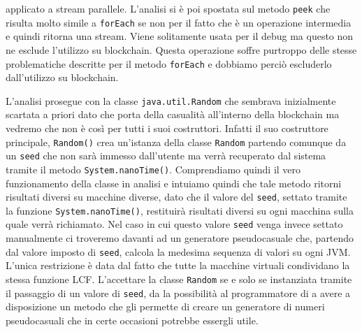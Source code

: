 applicato a stream parallele. L'analisi si è poi spostata sul metodo \lstinline|peek| che risulta molto simile a \lstinline|forEach| se non per il fatto che è un operazione intermedia e quindi ritorna una stream. Viene solitamente usata per il debug ma questo non ne esclude l'utilizzo su blockchain. Questa operazione soffre purtroppo delle stesse problematiche descritte per il metodo \lstinline|forEach| e dobbiamo perciò escluderlo dall'utilizzo su blockchain.

L'analisi prosegue con la classe \lstinline|java.util.Random| che sembrava inizialmente scartata a priori dato che porta della casualità all'interno della blockchain ma vedremo che non è così per tutti i suoi costruttori. Infatti il suo costruttore principale, \lstinline|Random()| crea un'istanza della classe \lstinline|Random| partendo comunque da un \lstinline|seed| che non sarà immesso dall'utente ma verrà recuperato dal sistema tramite il metodo \lstinline|System.nanoTime()|. Comprendiamo quindi il vero funzionamento della classe in analisi e intuiamo quindi che tale metodo ritorni risultati diversi su macchine diverse, dato che il valore del \lstinline|seed|, settato tramite la funzione \lstinline|System.nanoTime()|, restituirà risultati diversi su ogni macchina sulla quale verrà richiamato. Nel caso in cui questo valore \lstinline|seed| venga invece settato manualmente ci troveremo davanti ad un generatore pseudocasuale che, partendo dal valore imposto di \lstinline|seed|, calcola la medesima sequenza di valori su ogni JVM. L'unica restrizione è data dal fatto che tutte la macchine virtuali condividano la stessa funzione LCF. L'accettare la classe \lstinline|Random| se e solo se instanziata tramite il passaggio di un valore di \lstinline|seed|, da la possibilità al programmatore di a avere a disposizione un metodo che gli permette di creare un generatore di numeri pseudocasuali che in certe occasioni potrebbe essergli utile.

